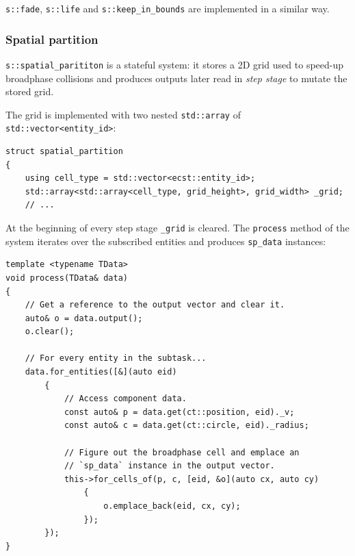 \documentclass[twoside, 12pt, a4paper, openright]{book}
\begin{document}
\texttt{s::fade},
\texttt{s::life}
and
\texttt{s::keep_in_bounds}
are implemented in a similar way.

\subsubsection{Spatial partition}\label{spatial-partition}

\texttt{s::spatial_parititon}
is a stateful system: it stores a 2D grid used to speed-up broadphase
collisions and produces outputs later read in \emph{step stage} to
mutate the stored grid.

The grid is implemented with two nested
\texttt{std::array}
of
\texttt{std::vector<entity_id>}:

\begin{verbatim}
struct spatial_partition
{
    using cell_type = std::vector<ecst::entity_id>;
    std::array<std::array<cell_type, grid_height>, grid_width> _grid;
    // ...
\end{verbatim}

At the beginning of every step stage
\texttt{_grid}
is cleared. The
\texttt{process}
method of the system iterates over the subscribed entities and produces
\texttt{sp_data}
instances:

\begin{verbatim}
template <typename TData>
void process(TData& data)
{
    // Get a reference to the output vector and clear it.
    auto& o = data.output();
    o.clear();

    // For every entity in the subtask...
    data.for_entities([&](auto eid)
        {
            // Access component data.
            const auto& p = data.get(ct::position, eid)._v;
            const auto& c = data.get(ct::circle, eid)._radius;

            // Figure out the broadphase cell and emplace an
            // `sp_data` instance in the output vector.
            this->for_cells_of(p, c, [eid, &o](auto cx, auto cy)
                {
                    o.emplace_back(eid, cx, cy);
                });
        });
}
\end{verbatim}
\end{document}
